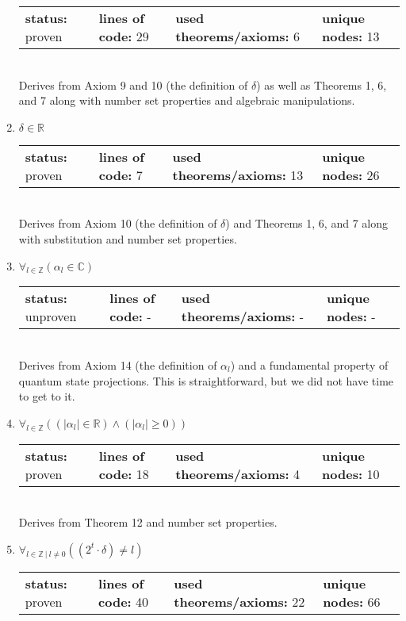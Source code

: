 \documentclass{article}[12pt]
\begin{document}
\begin{enumerate}
  \begin{tabular}{l | l | l | l}
    \textbf{status:} proven & \textbf{lines of code:} 29 & \textbf{used theorems/axioms:} 6 & \textbf{unique nodes:} 13
  \end{tabular} \hfill \\
Derives from Axiom 9 and 10 (the definition of $\delta$) as well as Theorems 1, 6, and 7 along with number set properties and algebraic manipulations.
\item $\delta \in \mathbb{R}$ \hfill \\
  \begin{tabular}{l | l | l | l}
    \textbf{status:} proven & \textbf{lines of code:} 7 & \textbf{used theorems/axioms:} 13 & \textbf{unique nodes:} 26
  \end{tabular} \hfill \\
Derives from Axiom 10 (the definition of $\delta$) and Theorems 1, 6, and 7 along with substitution and number set properties.
\item $\forall_{l \in \mathbb{Z}} \left(\alpha_{l} \in \mathbb{C}\right)$ \hfill \\
  \begin{tabular}{l | l | l | l}
    \textbf{status:} unproven & \textbf{lines of code:} - & \textbf{used theorems/axioms:} - & \textbf{unique nodes:} -
  \end{tabular} \hfill \\
Derives from Axiom 14 (the definition of $\alpha_l$) and a fundamental property of quantum state projections.  This is straightforward, but we did not have time to get to it.
\item $\forall_{l \in \mathbb{Z}} \left(\left(\left|\alpha_{l}\right| \in \mathbb{R}\right) \land \left(\left|\alpha_{l}\right| \geq 0\right)\right)$ \hfill \\
  \begin{tabular}{l | l | l | l}
    \textbf{status:} proven & \textbf{lines of code:} 18 & \textbf{used theorems/axioms:} 4 & \textbf{unique nodes:} 10
  \end{tabular} \hfill \\
Derives from Theorem 12 and number set properties.
\item $\forall_{l \in \mathbb{Z}~|~l \neq 0} \left(\left(2^{t} \cdot \delta\right) \neq l\right)$ \hfill \\
  \begin{tabular}{l | l | l | l}
    \textbf{status:} proven & \textbf{lines of code:} 40 & \textbf{used theorems/axioms:} 22 & \textbf{unique nodes:} 66

\end{tabular}
\end{enumerate}
\end{document}
